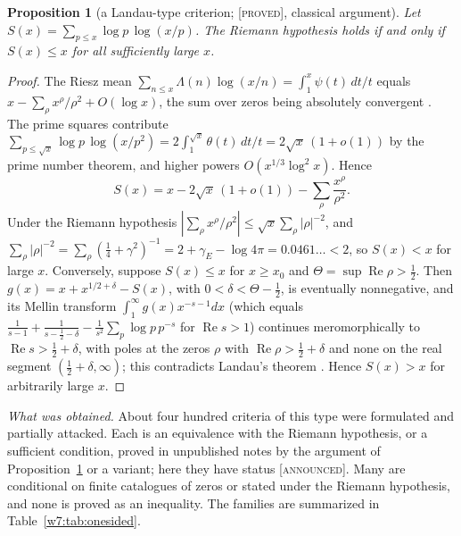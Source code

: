 \documentclass[11pt]{amsart}
\newtheorem{proposition}[theorem]{Proposition}
\theoremstyle{definition}
\theoremstyle{remark}
\numberwithin{equation}{section}
\DeclareMathOperator{\Rel}{Re}
\newcommand{\stag}[1]{\textsc{[#1]}}
\newcommand{\PROVED}{\stag{proved}}
\newcommand{\ANNOUNCED}{\stag{announced}}
\newcommand{\entry}[1]{\par\smallskip\noindent\textit{#1.}\enspace}
\begin{document}
\begin{proposition}[a Landau-type criterion; \PROVED, classical argument]\label{w7:prop:landau}
Let $S(x)=\sum_{p\le x}\log p\,\log(x/p)$. The Riemann hypothesis holds if and only if $S(x)\le x$ for all
sufficiently large $x$.
\end{proposition}

\begin{proof}
The Riesz mean $\sum_{n\le x}\Lambda(n)\log(x/n)=\int_1^x\psi(t)\,dt/t$ equals
$x-\sum_\rho x^\rho/\rho^2+O(\log x)$, the sum over zeros being absolutely convergent
\cite{Ingham1932}. The prime squares contribute
$\sum_{p\le\sqrt x}\log p\,\log(x/p^2)=2\int_1^{\sqrt x}\theta(t)\,dt/t=2\sqrt x\,(1+o(1))$ by the prime number
theorem, and higher powers $O(x^{1/3}\log^2x)$. Hence
\[
  S(x)=x-2\sqrt x\,(1+o(1))-\sum_\rho\frac{x^\rho}{\rho^2}.
\]
Under the Riemann hypothesis $|\sum_\rho x^\rho/\rho^2|\le\sqrt x\sum_\rho|\rho|^{-2}$, and
$\sum_\rho|\rho|^{-2}=\sum_\rho(\frac14+\gamma^2)^{-1}=2+\gamma_E-\log4\pi=0.0461\ldots<2$, so $S(x)<x$ for large $x$.
Conversely, suppose $S(x)\le x$ for $x\ge x_0$ and $\Theta=\sup\Rel\rho>\frac12$. Then
$g(x)=x+x^{1/2+\delta}-S(x)$, with $0<\delta<\Theta-\frac12$, is eventually nonnegative, and its Mellin transform
$\int_1^\infty g(x)x^{-s-1}dx$ (which equals $\frac1{s-1}+\frac1{s-\frac12-\delta}-\frac1{s^2}\sum_p\log p\,p^{-s}$
for $\Rel s>1$) continues meromorphically to $\Rel s>\frac12+\delta$, with poles at the zeros $\rho$ with
$\Rel\rho>\frac12+\delta$ and none on the real segment $(\frac12+\delta,\infty)$; this contradicts Landau's theorem
\cite[Ch.~V]{Ingham1932}. Hence $S(x)>x$ for arbitrarily large $x$.
\end{proof}

\entry{What was obtained} About four hundred criteria of this type were formulated and partially attacked.
Each is an equivalence with the Riemann hypothesis, or a sufficient condition, proved in unpublished notes by the
argument of Proposition~\ref{w7:prop:landau} or a variant; here they have status \ANNOUNCED. Many are
conditional on finite catalogues of zeros or stated under the Riemann hypothesis, and none is proved as an
inequality. The families are summarized in Table~\ref{w7:tab:onesided}.
\end{document}
